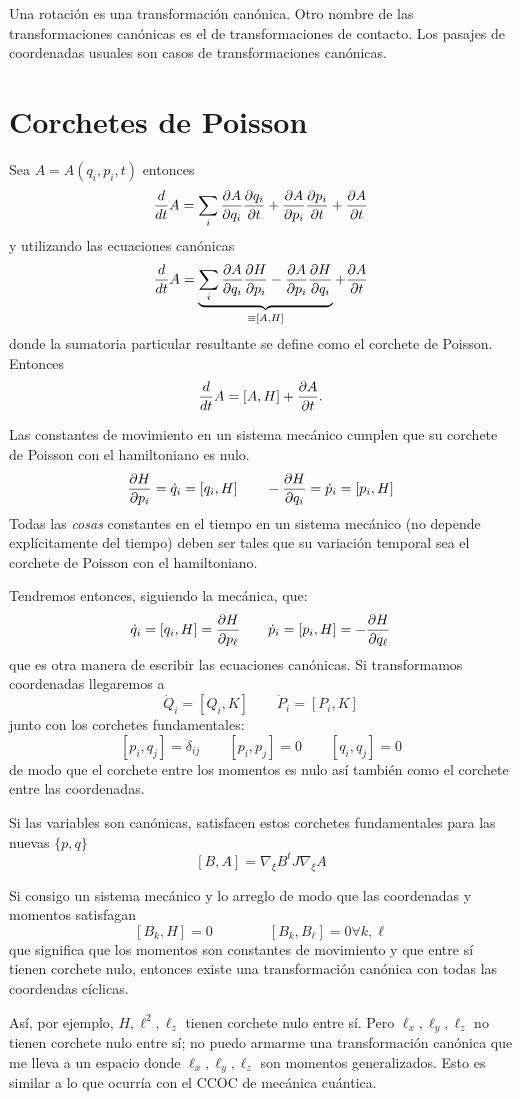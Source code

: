 \documentclass[10pt,oneside]{CBFT_book}
\begin{document}
Una rotación es una transformación canónica.
Otro nombre de las transformaciones canónicas es el de transformaciones de contacto.
Los pasajes de coordenadas usuales son casos de transformaciones canónicas.

\section{Corchetes de Poisson}

Sea $A=A(q_i,p_i,t)$ entonces
\[
	\frac{d}{dt}A = \sum_i \frac{\partial^{\hspace{-0.05em}} {A}}{\partial {q_i}^{\hspace{-0.05em}}} \frac{\partial^{\hspace{-0.05em}} {q_i}}{\partial {t}^{\hspace{-0.05em}}} + \frac{\partial^{\hspace{-0.05em}} {A}}{\partial {p_i}^{\hspace{-0.05em}}} \frac{\partial^{\hspace{-0.05em}} {p_i}}{\partial {t}^{\hspace{-0.05em}}} + \frac{\partial^{\hspace{-0.05em}} {A}}{\partial {t}^{\hspace{-0.05em}}}
\]
y utilizando las ecuaciones canónicas
\[
	\frac{d}{dt}A = \underbrace{\sum_i \frac{\partial^{\hspace{-0.05em}} {A}}{\partial {q_i}^{\hspace{-0.05em}}} \frac{\partial^{\hspace{-0.05em}} {H}}{\partial {p_i}^{\hspace{-0.05em}}} - \frac{\partial^{\hspace{-0.05em}} {A}}{\partial {p_i}^{\hspace{-0.05em}}} \frac{\partial^{\hspace{-0.05em}} {H}}{\partial {q_i}^{\hspace{-0.05em}}}}_{\equiv [A,H]} + 
\frac{\partial^{\hspace{-0.05em}} {A}}{\partial {t}^{\hspace{-0.05em}}}
\]
donde la sumatoria particular resultante se define como el corchete de Poisson.
Entonces
\[
	\frac{d}{dt}A = [A,H] + \frac{\partial^{\hspace{-0.05em}} {A}}{\partial {t}^{\hspace{-0.05em}}}.
\]

Las constantes de movimiento en un sistema mecánico cumplen que su corchete de Poisson con el hamiltoniano es nulo.
\[
	\frac{\partial^{\hspace{-0.05em}} {H}}{\partial {p_i}^{\hspace{-0.05em}}} = \dot{q}_i = [q_i,H] \qquad  -\frac{\partial^{\hspace{-0.05em}} {H}}{\partial {q_i}^{\hspace{-0.05em}}} = \dot{p}_i = [p_i,H]
\]
Todas las {\it cosas} constantes en el tiempo en un sistema mecánico (no depende explícitamente del tiempo) deben
ser tales que su variación temporal sea el corchete de Poisson con el hamiltoniano.

Tendremos entonces, siguiendo la mecánica, que:
\[
	\dot{q}_i = [q_i,H] = \frac{\partial^{\hspace{-0.05em}} {H}}{\partial {p_\ell}^{\hspace{-0.05em}}} \qquad \dot{p}_i = [p_i,H] = -\frac{\partial^{\hspace{-0.05em}} {H}}{\partial {q_\ell}^{\hspace{-0.05em}}}
\]
que es otra manera de escribir las ecuaciones canónicas.
Si transformamos coordenadas llegaremos a 
\[
	\dot{Q}_i = [ Q_i, K ] \qquad \dot{P}_i = [ P_i, K ]
\]
junto con los corchetes fundamentales:
\[
	[p_i,q_j] = \delta_{ij} \qquad [p_i,p_j] = 0 \qquad [q_i,q_j] = 0
\]
de modo que el corchete entre los momentos es nulo así también como el corchete entre las coordenadas.

Si las variables son canónicas, satisfacen estos corchetes fundamentales para las nuevas $\{p,q\}$
\[
	[B,A] = \nabla_\xi B^t J \nabla_\xi A
\]

Si consigo un sistema mecánico y lo arreglo de modo que las coordenadas y momentos satisfagan 
\[
	[B_k, H ] = 0 \qquad \qquad  [B_k, B_\ell ] = 0 \forall k,\ell
\]
que significa que los momentos son constantes de movimiento y que entre sí tienen corchete nulo, entonces
existe una transformación canónica con todas las coordendas cíclicas.

Así, por ejemplo, $H,\ell^2, \ell_z$ tienen corchete nulo entre sí. Pero $\ell_x, \ell_y, \ell_z$ no tienen corchete nulo
entre sí; no puedo armarme una transformación canónica que me lleva a un espacio donde $\ell_x, \ell_y, \ell_z$ son
momentos generalizados.
Esto es similar a lo que ocurría con el CCOC de mecánica cuántica.







\end{document}
